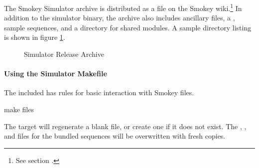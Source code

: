 The Smokey Simulator archive is distributed as a  file on the
Smokey wiki.\footnote{See section .}  In addition to
the simulator binary, the archive also includes ancillary files, a
, sample sequences, and a directory for shared modules.  A
sample directory listing is shown in figure \ref{fig:SimulatorArchive}.

\begin{figure}[h]

	\begin{CenteredDirectoryTree}
	\end{CenteredDirectoryTree}

	\caption{Simulator Release Archive}
	\label{fig:SimulatorArchive}

\end{figure}

\paragraph{Using the Simulator Makefile}

The included  has rules for basic interaction with Smokey
files.

\begin{CommandLine}
make files
\end{CommandLine}

The  target will regenerate a blank  file,
or create one if it does not exist.  The
, , and
 files for the bundled sequences will be overwritten with
fresh copies.

